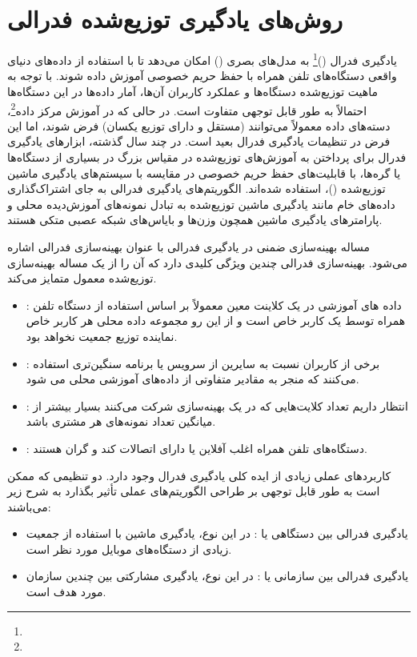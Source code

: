
\section{روش‌های یادگیری توزیع‌شده فدرالی}
یادگیری فدرال ()\footnote{} به مدل‌های بصری () امکان می‌دهد تا با استفاده از داده‌های دنیای واقعی دستگاه‌های تلفن همراه با حفظ حریم خصوصی آموزش داده شوند. با توجه به ماهیت توزیع‌شده دستگاه‌ها و عملکرد کاربران آن‌ها، آمار داده‌ها در این دستگاه‌ها احتمالاً به طور قابل توجهی متفاوت است. در حالی که در آموزش مرکز داده\footnote{}، دسته‌های داده معمولاً می‌توانند  (مستقل و دارای توزیع یکسان) فرض شوند، اما این فرض در تنظیمات یادگیری فدرال بعید است. در چند سال گذشته، ابزارهای یادگیری فدرال برای پرداختن به آموزش‌های توزیع‌شده در مقیاس بزرگ در بسیاری از دستگاه‌ها یا گره‌ها، با قابلیت‌های حفظ حریم خصوصی در مقایسه با سیستم‌های یادگیری ماشین توزیع‌شده ()، استفاده شده‌اند. الگوریتم‌های یادگیری فدرالی به جای اشتراک‌گذاری داده‌های خام مانند یادگیری ماشین توزیع‌شده به تبادل نمونه‌های آموزش‌دیده محلی و پارامترهای یادگیری ماشین همچون وزن‌ها و بایاس‌های شبکه‌ عصبی متکی هستند. 

مساله بهینه‌سازی ضمنی در یادگیری فدرالی با عنوان بهینه‌سازی فدرالی  اشاره می‌شود. بهینه‌سازی فدرالی چندین ویژگی کلیدی دارد که آن را از یک مساله بهینه‌سازی توزیع‌شده معمول متمایز می‌کند. 
\begin{itemize}
	\item 
	: داده های آموزشی در یک کلاینت معین معمولاً بر اساس استفاده از دستگاه تلفن همراه توسط یک کاربر خاص است و از این رو مجموعه داده محلی هر کاربر خاص نماینده توزیع جمعیت نخواهد بود.
	\item 
	: برخی از کاربران نسبت به سایرین از سرویس یا برنامه سنگین‌تری استفاده می‌کنند که منجر به مقادیر متفاوتی از داده‌های آموزشی محلی می شود.
	\item 
	: انتظار  داریم تعداد کلایت‌هایی که در یک بهینه‌سازی شرکت می‌کنند بسیار بیشتر از میانگین تعداد نمونه‌های هر مشتری باشد.
	\item
	: دستگاه‌های تلفن همراه اغلب آفلاین یا دارای اتصالات کند و گران هستند.
\end{itemize}

کاربردهای عملی زیادی از ایده کلی یادگیری فدرال وجود دارد. دو تنظیمی که ممکن است به طور قابل توجهی بر طراحی الگوریتم‌های عملی تأثیر بگذارد به شرح زیر می‌باشند:
\begin{itemize}
	\item 
	یادگیری فدرالی بین دستگاهی یا : در این نوع، یادگیری ماشین با استفاده از جمعیت زیادی از دستگاه‌های موبایل مورد نظر است.
	\item 
	یادگیری فدرالی بین سازمانی یا : در این نوع، یادگیری مشارکتی بین چندین سازمان مورد هدف است.
\end{itemize}

